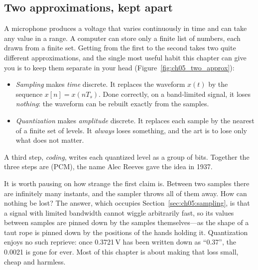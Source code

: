 
\subsection{Two approximations, kept apart}

A microphone produces a voltage that varies continuously in time and can take any value in a
range. A computer can store only a finite list of numbers, each drawn from a finite set. Getting
from the first to the second takes two quite different approximations, and the single most useful
habit this chapter can give you is to keep them separate in your head
(Figure~\ref{fig:ch05_two_approx}):
\begin{itemize}
\item \emph{Sampling} makes \emph{time} discrete. It replaces the waveform $x(t)$ by the sequence
$x[n]=x(nT_s)$. Done correctly, on a band-limited signal, it loses \emph{nothing}: the
waveform can be rebuilt exactly from the samples.
\item \emph{Quantization} makes \emph{amplitude} discrete. It replaces each sample by the nearest of a
finite set of levels. It \emph{always} loses something, and the art is to lose only what
does not matter.
\end{itemize}
A third step, \emph{coding}, writes each quantized level as a group of bits. Together the
three steps are  (PCM), the name Alec Reeves gave the idea in 1937.


It is worth pausing on how strange the first claim is. Between two samples there are infinitely
many instants, and the sampler throws all of them away. How can nothing be lost? The answer, which
occupies Section~\ref{sec:ch05:sampling}, is that a signal with limited bandwidth cannot wiggle
arbitrarily fast, so its values between samples are pinned down by the samples themselves---as
the shape of a taut rope is pinned down by the positions of the hands holding it. Quantization
enjoys no such reprieve: once 0.3721\,V has been written down as ``0.37'', the 0.0021 is gone
for ever. Most of this chapter is about making that loss small, cheap and harmless.

